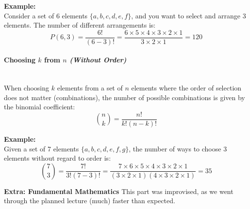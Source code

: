 \documentclass[]{article}
\begin{document}
	\textbf{Example:}
	\noindent\\
	Consider a set of 6 elements $\{a, b, c, d, e, f\}$, and you want to select and arrange 3 elements. The number of different arrangements is:
	$$
	P(6, 3)
	= \frac{6!}{(6-3)!}
	= \frac{6 \times 5 \times 4 \times 3 \times 2 \times 1}{3 \times 2 \times 1}
	= 120
	$$
	
	\paragraph{Choosing $k$ from $n$ \textit{(Without Order)}}
	\noindent\\
	When choosing $k$ elements from a set of $n$ elements where the order of selection does not matter (combinations), the number of possible combinations is given by the binomial coefficient:
	$$
	\binom{n}{k} = \frac{n!}{k!(n-k)!}
	$$
	
	\textbf{Example:}
	\noindent\\
	Given a set of 7 elements $\{a, b, c, d, e, f, g\}$, the number of ways to choose 3 elements without regard to order is:
	$$
	\binom{7}{3}
	= \frac{7!}{3!(7-3)!}
	= \frac{7 \times 6 \times 5 \times 4 \times 3 \times 2 \times 1}{(3 \times 2 \times 1)(4 \times 3 \times 2 \times 1)}
	= 35
	$$
	
	\newpage
	\textbf{{\LARGE Extra: Fundamental Mathematics}}
	This part was improvised, as we went through the planned lecture (much) faster than expected.
	
\end{document}
